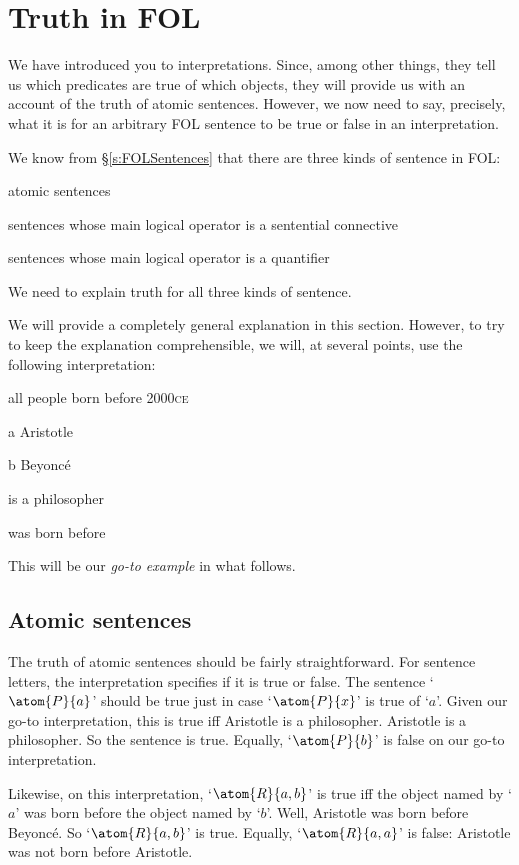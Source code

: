 \chapter{Truth in FOL}\label{s:TruthFOL}
We have introduced you to interpretations. Since, among other things, they tell us which predicates are true of which objects, they will provide us with an account of the truth of atomic sentences. However, we now need to say, precisely, what it is for an arbitrary FOL sentence to be true or false in an interpretation.

We know from \S\ref{s:FOLSentences} that there are three kinds of sentence in FOL: 
	\begin{ebullet}
		\item atomic sentences
		\item sentences whose main logical operator is a sentential connective
		\item sentences whose main logical operator is a quantifier
	\end{ebullet}
We need to explain truth for all three kinds of sentence.

We will provide a completely general explanation in this section. However, to try to keep the explanation comprehensible, we will, at several points, use the following interpretation:
	\begin{ekey}
		\item[\text{domain}] all people born before 2000\textsc{ce}
		\item[a] Aristotle
		\item[b] Beyonc\'e
		\item[\atom{P}{x}]  is a philosopher
		\item[\atom{R}{x,y}]  was born before 
	\end{ekey}
This will be our \emph{go-to example} in what follows.

\section{Atomic sentences}
The truth of atomic sentences should be fairly straightforward. For sentence letters, the interpretation specifies if it is true or false. The sentence `$\atom{P}{a}$' should be true just in case `$\atom{P}{x}$' is true of `$a$'. Given our go-to interpretation, this is true iff Aristotle is a philosopher. Aristotle is a philosopher. So the sentence is true. Equally, `$\atom{P}{b}$' is false on our go-to interpretation.

Likewise, on this interpretation, `$\atom{R}{a,b}$' is true iff the object named by `$a$' was born before the object named by `$b$'. Well, Aristotle was born before Beyonc\'e. So `$\atom{R}{a,b}$' is true. Equally, `$\atom{R}{a,a}$' is false: Aristotle was not born before Aristotle.

